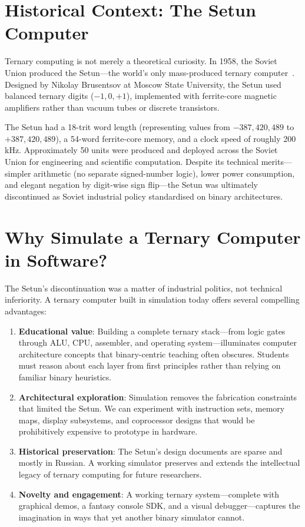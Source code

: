 \section{Historical Context: The Setun Computer}

Ternary computing is not merely a theoretical curiosity. In 1958, the Soviet Union produced the Setun---the world's only mass-produced ternary computer~\cite{brusentsov1965setun}. Designed by Nikolay Brusentsov at Moscow State University, the Setun used balanced ternary digits ($-1, 0, +1$), implemented with ferrite-core magnetic amplifiers rather than vacuum tubes or discrete transistors.

The Setun had a 18-trit word length (representing values from $-387{,}420{,}489$ to $+387{,}420{,}489$), a 54-word ferrite-core memory, and a clock speed of roughly 200 kHz. Approximately 50 units were produced and deployed across the Soviet Union for engineering and scientific computation. Despite its technical merits---simpler arithmetic (no separate signed-number logic), lower power consumption, and elegant negation by digit-wise sign flip---the Setun was ultimately discontinued as Soviet industrial policy standardised on binary architectures.

\section{Why Simulate a Ternary Computer in Software?}

The Setun's discontinuation was a matter of industrial politics, not technical inferiority. A ternary computer built in simulation today offers several compelling advantages:

\begin{enumerate}
    \item \textbf{Educational value}: Building a complete ternary stack---from logic gates through ALU, CPU, assembler, and operating system---illuminates computer architecture concepts that binary-centric teaching often obscures. Students must reason about each layer from first principles rather than relying on familiar binary heuristics.
    \item \textbf{Architectural exploration}: Simulation removes the fabrication constraints that limited the Setun. We can experiment with instruction sets, memory maps, display subsystems, and coprocessor designs that would be prohibitively expensive to prototype in hardware.
    \item \textbf{Historical preservation}: The Setun's design documents are sparse and mostly in Russian. A working simulator preserves and extends the intellectual legacy of ternary computing for future researchers.
    \item \textbf{Novelty and engagement}: A working ternary system---complete with graphical demos, a fantasy console SDK, and a visual debugger---captures the imagination in ways that yet another binary simulator cannot.
\end{enumerate}

